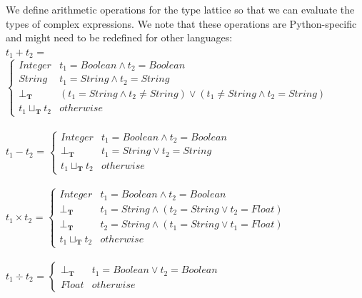 \documentclass[10pt]{report}
\begin{document}
We define arithmetic operations for the type lattice so that we can evaluate the types of complex expressions. We note that these operations are Python-specific and might need to be redefined for other languages:\\
\hspace*{15mm}$ t_{1} + t_{2}$ = $ \left\{
\begin{array}{ll}
Integer & t_{1} = Boolean \wedge t_{2} = Boolean \\
String & t_{1} = String \wedge t_{2} = String \\
\bot_{\mathbf{T}} & (t_{1} = String \wedge t_{2} \neq String) \vee (t_{1} \neq String \wedge t_{2} = String) \\
t_{1} \sqcup_{\mathbf{T}} t_{2} & otherwise
\end{array} 
\right. $ \\ \\

\hspace*{10mm}$ t_{1} - t_{2}$ = $ \left\{
\begin{array}{ll}
Integer & t_{1} = Boolean \wedge t_{2} = Boolean \\
\bot_{\mathbf{T}} & t_{1} = String \vee  t_{2} = String \\
t_{1} \sqcup_{\mathbf{T}} t_{2} & otherwise
\end{array} 
\right. $ \\ \\

\hspace*{10mm}$ t_{1} \times t_{2}$ = $ \left\{
\begin{array}{ll}
Integer & t_{1} = Boolean \wedge t_{2} = Boolean \\
\bot_{\mathbf{T}} & t_{1} = String \wedge  (t_{2} = String \vee t_{2} = Float) \\
\bot_{\mathbf{T}} & t_{2} = String \wedge  (t_{1} = String \vee t_{1} = Float) \\
t_{1} \sqcup_{\mathbf{T}} t_{2} & otherwise
\end{array} 
\right. $ \\ \\

\hspace*{10mm}$ t_{1} \div t_{2}$ = $ \left\{
\begin{array}{ll}
 \bot_{\mathbf{T}} & t_{1} = Boolean \vee t_{2} = Boolean \\
	Float & otherwise
\end{array} 
\right. $ \\ \\
 
\end{document}
